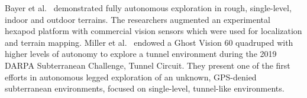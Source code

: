 \documentclass[letterpaper, 10pt, conference]{ieeeconf}      %
\newcommand{\ph}[1]{{\textbf{#1}:}} %
\newcommand{\todo}[1]{{\color{red} #1 }} %
\newcommand{\inst}[1]{{\color{orange} #1 }} %
\begin{document}
Bayer et al.~\cite{Bayer2019} demonstrated fully autonomous exploration in rough, single-level, indoor and outdoor terrains.
The researchers augmented an experimental hexapod platform with commercial vision sensors which were used for localization and terrain mapping.
Miller et al.~\cite{miller2019tunnel} 
endowed a Ghost Vision 60 quadruped with higher levels of autonomy to explore a tunnel environment during the 2019 DARPA Subterranean Challenge, Tunnel Circuit. They present one of the first efforts in autonomous legged exploration of an unknown, GPS-denied subterranean environments, focused on single-level, tunnel-like environments. 
\end{document}
